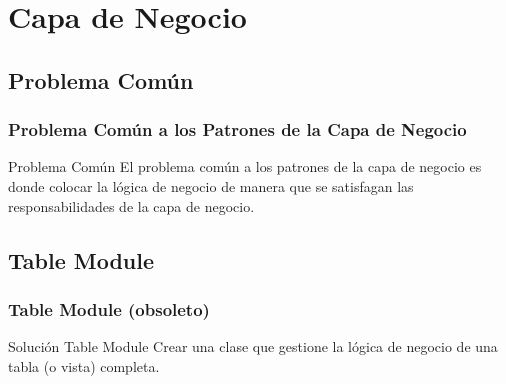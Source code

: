 \documentclass[a4paper,slidestop,xcolor=pst,dvips,blue]{beamer}
\begin{document}
%

\section{Capa de Negocio}

\subsection{Problema Común}

\begin{frame}
    \frametitle{Problema Común a los Patrones de la Capa de Negocio}
    \begin{block}{Problema Común}
        El problema común a los patrones de la capa de negocio es donde colocar la
        lógica de negocio de manera que se satisfagan las responsabilidades de la capa de negocio.
    \end{block}
\end{frame}

\subsection{Table Module}

\begin{frame}[c]
    \frametitle{Table Module (obsoleto)}
    \begin{block}{Solución Table Module}
        Crear una clase que gestione la lógica de negocio de una tabla (o vista) completa.
    \end{block}
\end{frame}
\end{document}
